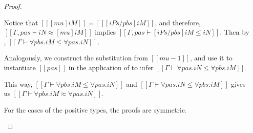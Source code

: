 \begin{proof}
\begin{caseof}
      Notice that $[[ [mu]iM ]] = [[ [iPs/pbs]iM ]]$, and therefore,
      $[[Γ, pas ⊢ iN ≈ [mu] iM]]$ implies $[[Γ, pas ⊢ [iPs/pbs]iM ≤ iN]]$. Then by
      , $[[Γ ⊢ ∀pbs.iM ≤ ∀pas.iN]]$.

      Analogously, we construct the substitution from $[[mu-1]]$, and use it to
      instantiate $[[pas]]$ in the application of
       to infer $[[Γ ⊢ ∀pas.iN ≤ ∀pbs.iM]]$.

      This way, $[[Γ ⊢ ∀pbs.iM ≤ ∀pas.iN]]$ and $[[Γ ⊢ ∀pas.iN ≤ ∀pbs.iM]]$
      gives us $[[Γ ⊢ ∀pbs.iM ≈ ∀pas.iN]]$.

    \item For the cases of the positive types, the proofs are symmetric.
  \end{caseof}
\end{proof}

